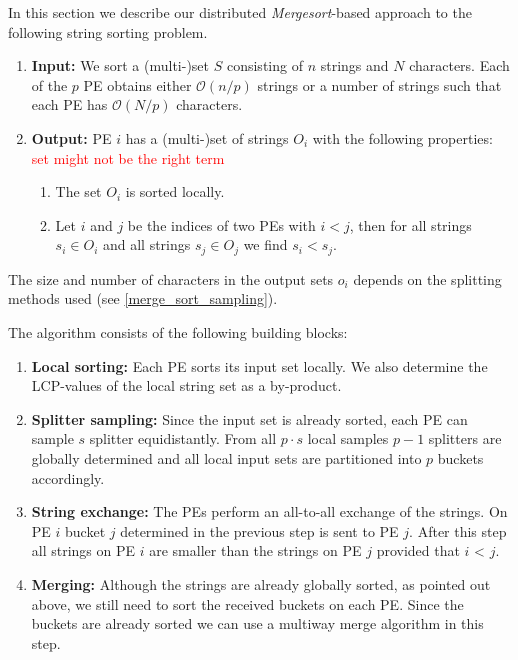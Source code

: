 In this section we describe our distributed \emph{Mergesort}-based approach to the following string sorting problem.

\begin{enumerate}
	\item \textbf{Input:} We sort a (multi-)set $S$ consisting of $n$ strings and $N$ characters. Each of the $p$ PE obtains either $\mathcal{O}(n/p)$ strings or a number of strings such that each PE has $\mathcal{O}(N/p)$ characters.
	\item \textbf{Output:} PE $i$ has a (multi-)set of strings $O_i$ with the following properties: \textcolor{red}{set might not be the right term}
	\begin{enumerate}
		\item The set $O_i$ is sorted locally.
		\item Let $i$ and $j$ be the indices of two PEs with $i < j$, then for all strings $s_i \in O_i$ and all strings $s_j \in O_j$ we find $s_i < s_j$.
	\end{enumerate}
\end{enumerate} 
The size and number of characters in the output sets $o_i$ depends on the splitting methods used (see \ref{merge_sort_sampling}).

The algorithm consists of the following building blocks:

\begin{enumerate}
	\item \textbf{Local sorting:} Each PE sorts its input set locally. We also determine the LCP-values of the local string set as a by-product.
	\item \textbf{Splitter sampling:} \label{merge_sort_sampling}Since the input set is already sorted, each PE can sample $s$ splitter equidistantly. From all $p \cdot s$ local samples $p-1$ splitters are globally determined and all local input sets are partitioned into $p$ buckets accordingly. 
	\item \textbf{String exchange:} The PEs perform an all-to-all exchange of the strings. On PE $i$ bucket $j$ determined in the previous step is sent to PE $j$. After this step all strings on PE $i$ are smaller than the strings on PE $j$ provided that $i$ < $j$.
	\item \textbf{Merging:} Although the strings are already globally sorted, as pointed out above, we still need to sort the received buckets on each PE. Since the buckets are already sorted we can use a multiway merge algorithm in this step.
\end{enumerate}

